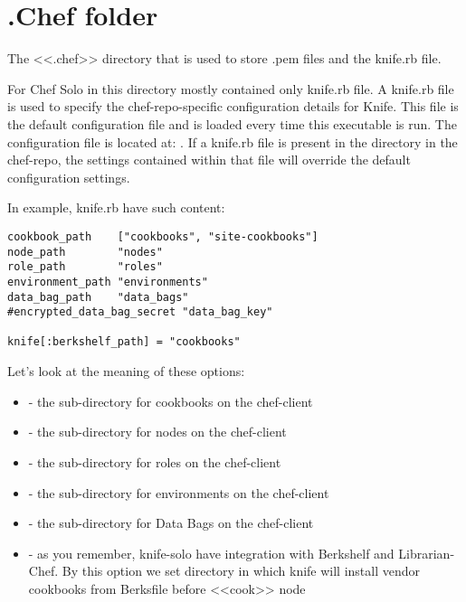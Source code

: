 \section{.Chef folder}
\label{sec:solo-chef-folder}

The <<.chef>> directory that is used to store .pem files and the knife.rb file.

For Chef Solo in this directory mostly contained only knife.rb file. A knife.rb file is used to specify the chef-repo-specific configuration details for Knife. This file is the default configuration file and is loaded every time this executable is run. The configuration file is located at: . If a knife.rb file is present in the  directory in the chef-repo, the settings contained within that file will override the default configuration settings.

In example, knife.rb have such content:

\begin{lstlisting}[label=lst:my-cloud-chef-folder1,title=my-cloud/.chef/knife.rb]
cookbook_path    ["cookbooks", "site-cookbooks"]
node_path        "nodes"
role_path        "roles"
environment_path "environments"
data_bag_path    "data_bags"
#encrypted_data_bag_secret "data_bag_key"

knife[:berkshelf_path] = "cookbooks"
\end{lstlisting}

Let's look at the meaning of these options:

\begin{itemize}
  \item {} - the sub-directory for cookbooks on the chef-client
  \item {} - the sub-directory for nodes on the chef-client
  \item {} - the sub-directory for roles on the chef-client
  \item {} - the sub-directory for environments on the chef-client
  \item {} - the sub-directory for Data Bags on the chef-client
  \item {} - as you remember, knife-solo have integration with Berkshelf and Librarian-Chef. By this option we set directory in which knife will install vendor cookbooks from Berksfile before <<cook>> node
\end{itemize}
